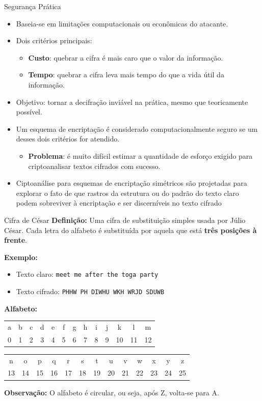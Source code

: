 \begin{frame}{Segurança Prática}
 
\begin{itemize}
    \item Baseia-se em limitações computacionais ou econômicas do atacante.  
    \item Dois critérios principais:  
        \begin{itemize}
            \item \textbf{Custo}: quebrar a cifra é mais caro que o valor da informação.  
            \item \textbf{Tempo}: quebrar a cifra leva mais tempo do que a vida útil da informação.  
        \end{itemize}
    \item Objetivo: tornar a decifração inviável na prática, mesmo que teoricamente possível.

    \item Um esquema de encriptação é considerado computacionalmente seguro se um desses dois critérios for atendido. 
    \begin{itemize}
        \item \textbf{Problema}: é muito difícil estimar a quantidade de esforço exigido para criptoanalisar textos
cifrados com sucesso.
    \end{itemize}
    \item Ciptoanálise para esquemas de encriptação simétricos são projetadas para explorar o
fato de que rastros da estrutura ou do padrão do texto claro podem sobreviver à encriptação e ser discerníveis
no texto cifrado
\end{itemize}
\end{frame}

\begin{frame}{Cifra de César}
\textbf{Definição:}  
Uma cifra de substituição simples usada por Júlio César. Cada letra do alfabeto é substituída por aquela que está \textbf{três posições à frente}.  

\medskip
\textbf{Exemplo:}  
\begin{itemize}
    \item Texto claro: \texttt{meet me after the toga party}  
    \item Texto cifrado: \texttt{PHHW PH DIWHU WKH WRJD SDUWB}  
\end{itemize}

\textbf{Alfabeto:} \\ 
\begin{tabular}{c c c c c c c c c c c c c}
a & b & c & d & e & f & g & h & i & j & k & l & m \\
0 & 1 & 2 & 3 & 4 & 5 & 6 & 7 & 8 & 9 & 10 & 11 & 12
\end{tabular}

\begin{tabular}{c c c c c c c c c c c c c}
n & o & p & q & r & s & t & u & v & w & x & y & z \\
13 & 14 & 15 & 16 & 17 & 18 & 19 & 20 & 21 & 22 & 23 & 24 & 25
\end{tabular}

\medskip
\textbf{Observação:}  
O alfabeto é circular, ou seja, após Z, volta-se para A.
\end{frame}

